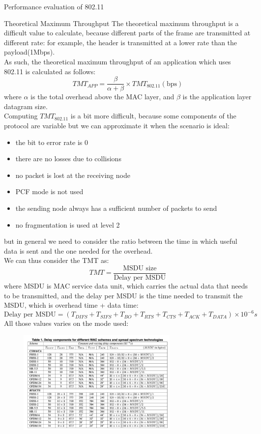 \begin{section}{Performance evaluation of 802.11}
\begin{subsection}{Theoretical Maximum Throughput}
    The theoretical maximum throughput is a difficult value to calculate, because different parts 
    of the frame are transmitted at different rate: for example, the header is transmitted at a 
    lower rate than the payload(1Mbps).\\
    As such, the theoretical maximum throughput of an application which uses 802.11 is calculated as follows:
    \begin{equation}
      TMT_{APP} = \frac{\beta}{\alpha + \beta}\times TMT_{802.11}(\text{bps})
    \end{equation}
    where $\alpha$ is the total overhead above the MAC layer, and $\beta$ is the application layer
    datagram size.\\
    Computing $TMT_{802.11}$ is a bit more difficult, because some components of the protocol are variable
    but we can approximate it when the scenario is ideal:
    \begin{itemize}
      \item the bit to error rate is 0
      \item there are no losses due to collisions
      \item no packet is lost at the receiving node
      \item PCF mode is not used 
      \item the sending node always has a sufficient number of packets to send
      \item no fragmentation is used at level 2
    \end{itemize}
    but in general we need to consider the ratio between the time in which useful data is sent 
    and the one needed for the overhead.\\
    We can thus consider the TMT as:
    \begin{equation}
      TMT = \frac{\text{MSDU size}}{\text{Delay per MSDU}}
    \end{equation}
    where MSDU is MAC service data unit, which carries the actual data that needs to be transmitted,
    and the delay per MSDU is the time needed to transmit the MSDU, which is overhead time + data time:
    \begin{equation}
      \text{Delay per MSDU} = (T_{DIFS} + T_{SIFS} + T_{BO} + T_{RTS} + T_{CTS} + T_{ACK} + T_{DATA}) \times 10^{-6}s
    \end{equation}
    All those values varies on the mode used:
    \begin{figure}[H]
      \centering
      \includegraphics[width=0.7\textwidth]{img/wireless/delay components.png}

\end{figure}
\end{subsection}
\end{section}
